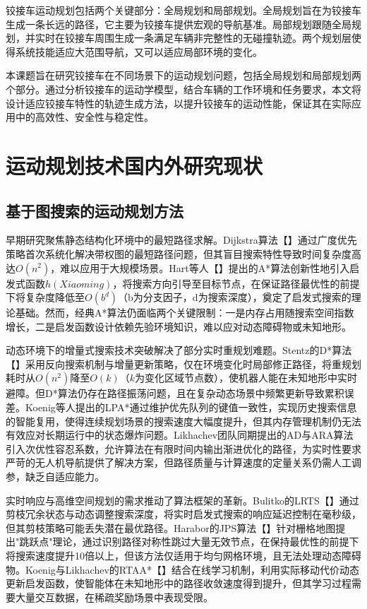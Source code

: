 \documentclass[master,academic]{ysuthesis} %
\begin{document}
	铰接车运动规划包括两个关键部分：全局规划和局部规划。全局规划旨在为铰接车生成一条长远的路径，它主要为铰接车提供宏观的导航基准。局部规划跟随全局规划，并实时在铰接车周围生成一条满足车辆非完整性的无碰撞轨迹。两个规划层使得系统技能适应大范围导航，又可以适应局部环境的变化。

	本课题旨在研究铰接车在不同场景下的运动规划问题，包括全局规划和局部规划两个部分。通过分析铰接车的运动学模型，结合车辆的工作环境和任务要求，本文将设计适应铰接车特性的轨迹生成方法，以提升铰接车的运动性能，保证其在实际应用中的高效性、安全性与稳定性。
	\section{运动规划技术国内外研究现状}
		\subsection{基于图搜索的运动规划方法}
		早期研究聚焦静态结构化环境中的最短路径求解。Dijkstra算法【】通过广度优先策略首次系统化解决带权图的最短路径问题，但其盲目搜索特性导致时间复杂度高达$O(n^2)$，难以应用于大规模场景。Hart等人【】提出的A*算法创新性地引入启发式函数$h(Xiaoming)$，将搜索方向引导至目标节点，在保证路径最优性的前提下将复杂度降低至$O(b^d)$（b为分支因子，d为搜索深度），奠定了启发式搜索的理论基础。然而，经典A*算法仍面临两个关键限制：一是内存占用随搜索空间指数增长，二是启发函数设计依赖先验环境知识，难以应对动态障碍物或未知地形。

		动态环境下的增量式搜索技术突破解决了部分实时重规划难题。Stentz的D*算法【】采用反向搜索机制与增量更新策略，仅在环境变化时局部修正路径，将重规划耗时从$O(n^2)$降至$O(k)$（$k$为变化区域节点数），使机器人能在未知地形中实时避障。但D*算法仍存在路径振荡问题，且在复杂动态场景中频繁更新导致累积误差。Koenig等人提出的LPA*通过维护优先队列的键值一致性，实现历史搜索信息的智能复用，使得连续规划场景的搜索速度大幅度提升，但其内存管理机制仍无法有效应对长期运行中的状态爆炸问题。Likhachev团队同期提出的AD与ARA算法引入次优性容忍系数，允许算法在有限时间内输出渐进优化的路径，为实时性要求严苛的无人机导航提供了解决方案，但路径质量与计算速度的定量关系仍需人工调参，缺乏自适应能力。

		实时响应与高维空间规划的需求推动了算法框架的革新。Bulitko的LRTS【】通过剪枝冗余状态与动态调整搜索深度，将实时启发式搜索的响应延迟控制在毫秒级，但其剪枝策略可能丢失潜在最优路径。Harabor的JPS算法【】针对栅格地图提出"跳跃点"理论，通过识别路径对称性跳过大量无效节点，在保持最优性的前提下将搜索速度提升10倍以上，但该方法仅适用于均匀网格环境，且无法处理动态障碍物。Koenig与Likhachev的RTAA*【】结合在线学习机制，利用实际移动代价动态更新启发函数，使智能体在未知地形中的路径收敛速度得到提升，但其学习过程需要大量交互数据，在稀疏奖励场景中表现受限。
\end{document}

